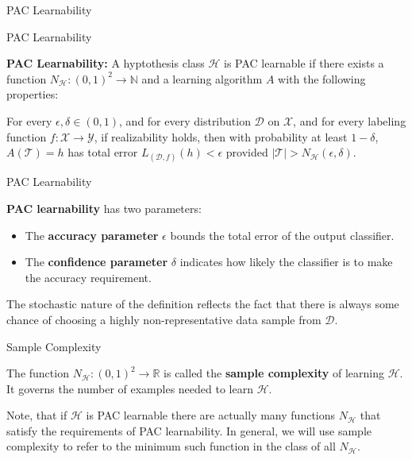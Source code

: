 \documentclass[10pt, table, handout]{beamer}
\newcommand{\cT}{\ensuremath{\mathcal{T}}}
\newcommand{\cD}{\ensuremath{\mathcal{D}}}
\newcommand{\cX}{\ensuremath{\mathcal{X}}}
\newcommand{\cY}{\ensuremath{\mathcal{Y}}}
\newcommand{\cH}{\ensuremath{\mathcal{H}}}
\newcommand{\bR}{\ensuremath{\mathbb{R}}}
\begin{document}
\begin{frame}[fragile]{PAC Learnability}
\begin{minipage}[t][0.6\textheight][t]{\textwidth}
  \end{minipage}


\end{frame}





\begin{frame}[fragile]{PAC Learnability}


\textbf{PAC Learnability:} A hyptothesis class $\cH$ is PAC learnable if there exists a function $N_{\mathcal{H}}:(0,1)^2\to \mathbb{N}$ and a learning algorithm $A$ with the following properties:\newline

For every $\epsilon, \delta\in (0,1)$, and for every distribution $\mathcal{D}$ on $\cX$, and for every labeling function $f:\cX\to \cY$, if realizability holds, then with probability at least $1-\delta$, $A(\cT) = h$ has total error $L_{(\cD,f)}(h)<\epsilon$ provided $|\cT|>N_{\cH}(\epsilon, \delta)$.
\end{frame}




\begin{frame}[fragile]{PAC Learnability}


\textbf{PAC learnability} has two parameters: 

\begin{itemize}
\item[] The \textbf{accuracy parameter} $\epsilon$ bounds the total error of the output classifier.\pause
\item[] The \textbf{confidence parameter} $\delta$ indicates how likely the classifier is to make the accuracy requirement. \pause
\end{itemize}

The stochastic nature of the definition reflects the fact that there is always some chance of choosing a highly non-representative data sample from $\mathcal{D}$. 

\end{frame}





\begin{frame}[fragile]{Sample Complexity}


The function $N_{\cH}:(0,1)^2\to \bR$ is called the \textbf{sample complexity} of learning $\cH$. It governs the number of examples needed to learn $\cH$. \newline

Note, that if $\cH$ is PAC learnable there are actually many functions $N_\cH$ that satisfy the requirements of PAC learnability. In general, we will use sample complexity to refer to the minimum such function in the class of all $N_\cH$. 



\end{frame}
\end{document}
